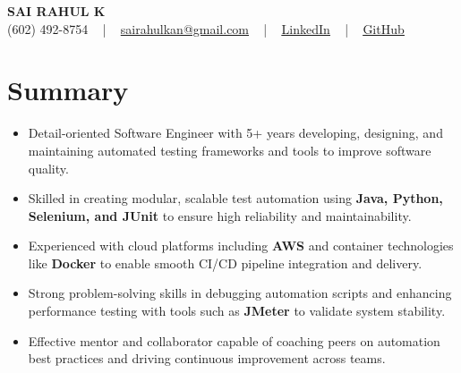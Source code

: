 \documentclass[letterpaper,11pt]{article}
\newcommand{\resumeItem}[1]{
  \item\footnotesize{
    {#1 \vspace{-2pt}}
  }
}
\newcommand{\resumeItemListStart}{\begin{itemize}[leftmargin=*]}
\newcommand{\resumeItemListEnd}{\end{itemize}\vspace{-5pt}}
\begin{document}
\begin{center}
    {\fontsize{14pt}{12pt}\selectfont \textbf{\MakeUppercase{Sai Rahul K}}}\\ \vspace{2pt}
    \fontsize{10pt}{12pt}\selectfont (602) 492-8754 ~ | ~ \href{mailto:sairahulkan@gmail.com}{sairahulkan@gmail.com} ~ | ~
    \href{https://www.linkedin.com/in/rq123/}{\color{blue}\underline{LinkedIn}} ~ | ~
    \href{https://github.com/kanrahuldo}{\color{blue}\underline{GitHub}}~
    \vspace{-8pt}
\end{center}

\section{Summary}
\fontsize{9pt}{10pt}\selectfont
\resumeItemListStart
    \resumeItem{Detail-oriented Software Engineer with 5+ years developing, designing, and maintaining automated testing frameworks and tools to improve software quality.}
    \resumeItem{Skilled in creating modular, scalable test automation using \textbf{Java, Python, Selenium, and JUnit} to ensure high reliability and maintainability.}
    \resumeItem{Experienced with cloud platforms including \textbf{AWS} and container technologies like \textbf{Docker} to enable smooth CI/CD pipeline integration and delivery.}
    \resumeItem{Strong problem-solving skills in debugging automation scripts and enhancing performance testing with tools such as \textbf{JMeter} to validate system stability.}
    \resumeItem{Effective mentor and collaborator capable of coaching peers on automation best practices and driving continuous improvement across teams.}
\resumeItemListEnd
\vspace{-6pt}
\end{document}
